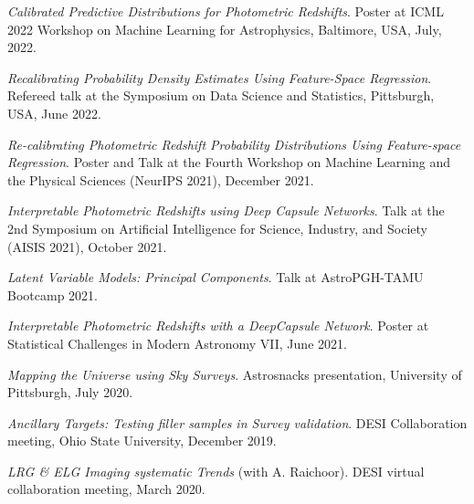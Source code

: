 \begin{etaremune}[leftmargin=40pt,labelsep=10pt]
    \item \textit{Calibrated Predictive Distributions for Photometric Redshifts}. Poster at ICML 2022 Workshop on Machine Learning for Astrophysics, Baltimore, USA, July, 2022.
    \item \textit{Recalibrating Probability Density Estimates Using Feature-Space Regression}. Refereed talk at the Symposium on Data Science and Statistics, Pittsburgh, USA, June 2022.
    \item \textit{Re-calibrating Photometric Redshift Probability Distributions Using Feature-space Regression}. Poster and Talk at the Fourth Workshop on Machine Learning and the Physical Sciences (NeurIPS 2021), December 2021.
    \item \textit{Interpretable Photometric Redshifts using Deep Capsule Networks}. Talk at the 2nd Symposium on Artificial Intelligence for Science, Industry, and Society (AISIS 2021), October 2021.
     \item \textit{Latent Variable Models: Principal Components}. Talk at AstroPGH-TAMU Bootcamp 2021.
    \item \textit{Interpretable Photometric Redshifts with a DeepCapsule Network}. Poster at Statistical Challenges in Modern Astronomy VII, June 2021.
    \item \textit{Mapping the Universe using Sky Surveys}. Astrosnacks presentation, University of Pittsburgh, July 2020.
    \item \textit{Ancillary Targets: Testing filler samples in Survey validation}. DESI Collaboration meeting, Ohio State University, December 2019.
    \item \textit{LRG \& ELG Imaging systematic Trends} (with A. Raichoor). DESI virtual collaboration meeting, March 2020.
\end{etaremune}

